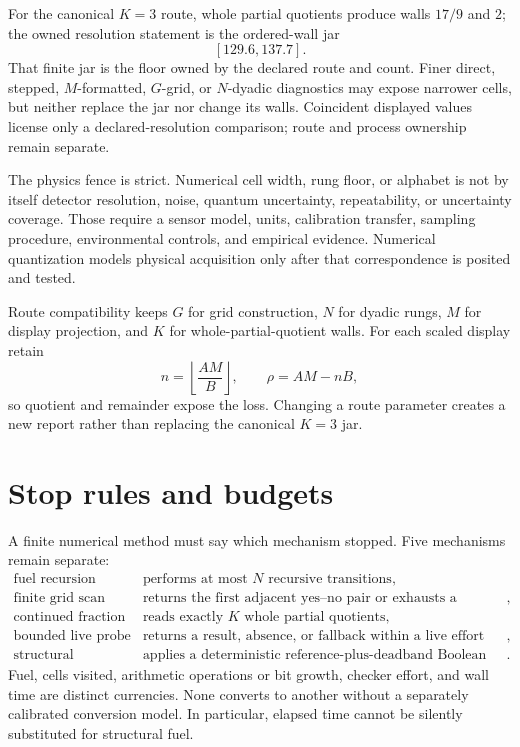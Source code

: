 For the canonical \(K=3\) route, whole partial quotients produce walls \(17/9\) and \(2\); the owned resolution
statement is the ordered-wall jar
\[
                             [129.6,137.7].
\]
That finite jar is the floor owned by the declared route and count.  Finer direct, stepped, \(M\)-formatted, \(G\)-grid,
or \(N\)-dyadic
diagnostics may expose narrower cells, but neither replace the jar nor change its walls.  Coincident displayed values
license only a declared-resolution comparison; route and process ownership remain separate.

The physics fence is strict.  Numerical cell width, rung floor, or alphabet is not by itself detector resolution,
noise, quantum uncertainty, repeatability, or uncertainty coverage.  Those require a sensor model, units, calibration
transfer, sampling procedure, environmental controls, and empirical evidence.  Numerical quantization models physical
acquisition only after that correspondence is posited and tested.

Route compatibility keeps \(G\) for grid construction, \(N\) for dyadic rungs, \(M\) for display projection, and
\(K\) for whole-partial-quotient walls.  For each scaled display retain
\[
                  n=\left\lfloor\frac{AM}{B}\right\rfloor,\qquad
                  \rho=AM-nB,
\]
so quotient and remainder expose the loss.  Changing a route parameter creates a new report rather than replacing the
canonical \(K=3\) jar.

\section{Stop rules and budgets}

A finite numerical method must say which mechanism stopped.  Five mechanisms remain separate:
\[
\begin{array}{ll}
\text{fuel recursion}&\text{performs at most \(N\) recursive transitions},\\
\text{finite grid scan}&\text{returns the first adjacent yes--no pair or exhausts a declared grid},\\
\text{continued fraction}&\text{reads exactly \(K\) whole partial quotients},\\
\text{bounded live probe}&\text{returns a result, absence, or fallback within a live effort bound},\\
\text{structural outgrowth}&\text{applies a deterministic reference-plus-deadband Boolean rule}.
\end{array}
\]
Fuel, cells visited, arithmetic operations or bit growth, checker effort, and wall time are distinct currencies.
None converts to another without a separately calibrated conversion model.  In particular, elapsed time cannot be
silently substituted for structural fuel.

